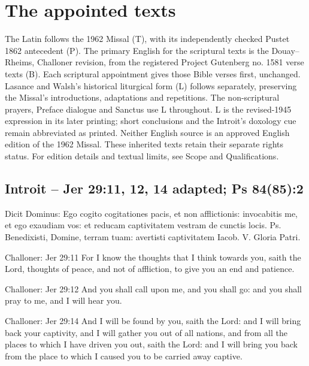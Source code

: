 \section{The appointed texts}

The Latin follows the 1962 Missal (T), with its independently checked
Pustet 1862 antecedent (P). The primary English for the scriptural texts
is the Douay--Rheims, Challoner revision, from the registered Project
Gutenberg no. 1581 verse texts (B). Each scriptural appointment gives
those Bible verses first, unchanged. Lasance and Walsh's historical
liturgical form (L) follows separately, preserving the Missal's
introductions, adaptations and repetitions. The non-scriptural prayers,
Preface dialogue and Sanctus use L throughout. L is the revised-1945
expression in its later printing; short conclusions and the Introit's
doxology cue remain abbreviated as printed. Neither English source is
an approved English edition of the 1962 Missal. These inherited texts
retain their separate rights status. For edition details and textual
limits, see Scope and Qualifications.

\subsection{Introit -- Jer 29:11, 12, 14 adapted; Ps 84(85):2}
\label{proper-introit}

\begin{latinproper}
Dicit Dominus: Ego cogito cogitationes pacis, et non afflictionis:
invocabitis me, et ego exaudiam vos: et reducam captivitatem vestram de
cunctis locis. Ps. Benedixisti, Domine, terram tuam: avertisti captivitatem
Iacob. V. Gloria Patri.
\end{latinproper}

\begin{englishwitness}{Challoner: Jer 29:11}
For I know the thoughts that I think towards you, saith the Lord, thoughts
of peace, and not of affliction, to give you an end and patience.
\end{englishwitness}

\begin{englishwitness}{Challoner: Jer 29:12}
And you shall call upon me, and you shall go: and you shall pray to me,
and I will hear you.
\end{englishwitness}

\begin{englishwitness}{Challoner: Jer 29:14}
And I will be found by you, saith the Lord: and I will bring back your
captivity, and I will gather you out of all nations, and from all the
places to which I have driven you out, saith the Lord: and I will bring
you back from the place to which I caused you to be carried away captive.
\end{englishwitness}

